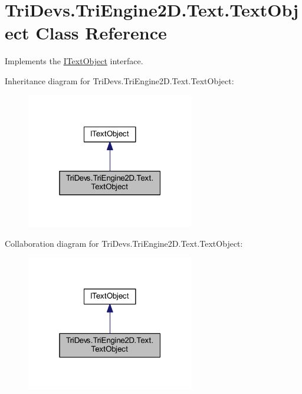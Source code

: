 \hypertarget{class_tri_devs_1_1_tri_engine2_d_1_1_text_1_1_text_object}{\section{Tri\-Devs.\-Tri\-Engine2\-D.\-Text.\-Text\-Object Class Reference}
\label{class_tri_devs_1_1_tri_engine2_d_1_1_text_1_1_text_object}
}


Implements the \hyperlink{interface_tri_devs_1_1_tri_engine2_d_1_1_text_1_1_i_text_object}{I\-Text\-Object} interface.  




Inheritance diagram for Tri\-Devs.\-Tri\-Engine2\-D.\-Text.\-Text\-Object\-:\nopagebreak
\begin{figure}[H]
\begin{center}
\leavevmode
\includegraphics[width=208pt]{class_tri_devs_1_1_tri_engine2_d_1_1_text_1_1_text_object__inherit__graph}
\end{center}
\end{figure}


Collaboration diagram for Tri\-Devs.\-Tri\-Engine2\-D.\-Text.\-Text\-Object\-:\nopagebreak
\begin{figure}[H]
\begin{center}
\leavevmode
\includegraphics[width=208pt]{class_tri_devs_1_1_tri_engine2_d_1_1_text_1_1_text_object__coll__graph}
\end{center}
\end{figure}
